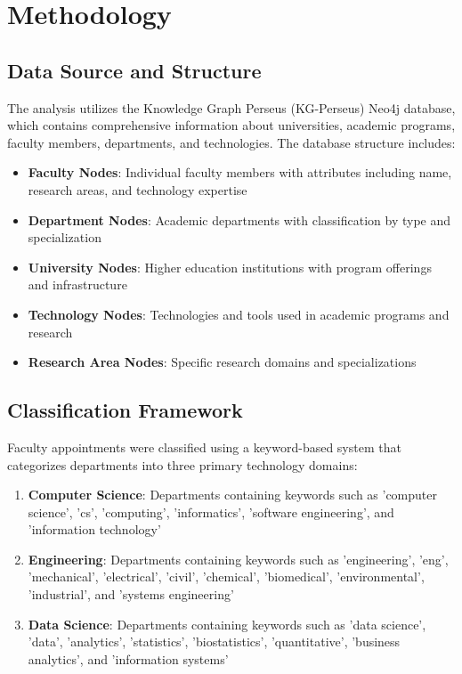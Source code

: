 \documentclass[12pt]{article}
\begin{document}
\section{Methodology}

\subsection{Data Source and Structure}

The analysis utilizes the Knowledge Graph Perseus (KG-Perseus) Neo4j database, which contains comprehensive information about universities, academic programs, faculty members, departments, and technologies. The database structure includes:

\begin{itemize}
    \item \textbf{Faculty Nodes}: Individual faculty members with attributes including name, research areas, and technology expertise
    \item \textbf{Department Nodes}: Academic departments with classification by type and specialization
    \item \textbf{University Nodes}: Higher education institutions with program offerings and infrastructure
    \item \textbf{Technology Nodes}: Technologies and tools used in academic programs and research
    \item \textbf{Research Area Nodes}: Specific research domains and specializations
\end{itemize}

\subsection{Classification Framework}

Faculty appointments were classified using a keyword-based system that categorizes departments into three primary technology domains:

\begin{enumerate}
    \item \textbf{Computer Science}: Departments containing keywords such as 'computer science', 'cs', 'computing', 'informatics', 'software engineering', and 'information technology'
    \item \textbf{Engineering}: Departments containing keywords such as 'engineering', 'eng', 'mechanical', 'electrical', 'civil', 'chemical', 'biomedical', 'environmental', 'industrial', and 'systems engineering'
    \item \textbf{Data Science}: Departments containing keywords such as 'data science', 'data', 'analytics', 'statistics', 'biostatistics', 'quantitative', 'business analytics', and 'information systems'
\end{enumerate}
\end{document}
